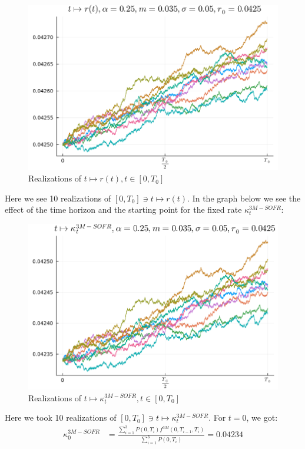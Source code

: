 \begin{figure}[htp]
    \centering
    \includegraphics[width=12cm]{figures/SOFR/1M_Vasicek_relaizations.PNG}
    \caption{Realizations of $t \mapsto r(t), t \in [0,T_{0}]$}
    \label{fig: Vasicek_paths}
\end{figure}

Here we see 10 realizations of $[0,T_{0}] \ni t \mapsto r(t)$. In the graph below we see the effect of the time horizon and the starting point for the fixed rate $\kappa_{t}^{3M-SOFR}$:


\begin{figure}[htp]
    \centering
    \includegraphics[width=12cm]{figures/SOFR/3M_SOFR_swap_rate_Vasicek.PNG}
    \caption{Realizations of $t \mapsto \kappa_{t}^{3M-SOFR}, t \in [0,T_{0}]$}
    \label{fig: 3M_SOFR_swap_rate}
\end{figure}

Here we took 10 realizations of $[0,T_{0}] \ni t \mapsto \kappa_{t}^{3M-SOFR}$. For $t=0$, we got: 
\begin{align*}
\kappa_{0}^{3M-SOFR} &= 
\frac{
\sum_{i=1}^{3}P(0,T_{i})f^{3M}(0,T_{i-1}, T_{i})
}{
\sum_{i=1}^{3}P(0,T_{i})
}
= 
0.04234
\end{align*}





